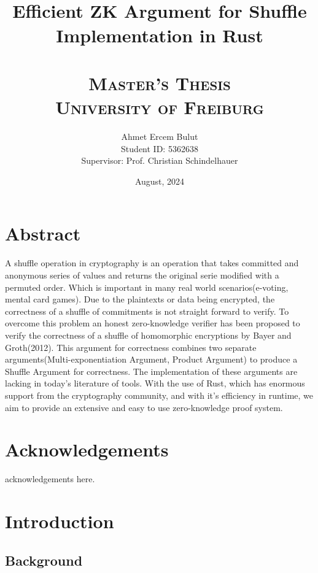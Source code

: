 \documentclass[12pt,a4paper]{report}
\title{
    \HRule \\[0.4cm]
    {\huge \bfseries  Efficient ZK Argument for Shuffle Implementation in Rust \\[0.4cm]}
    \HRule \\[1.5cm]
    \textsc{\Large Master's Thesis}\\[0.5cm]
    \textsc{\large University of Freiburg}\\[0.5cm]
}
\author{
    \Large Ahmet Ercem Bulut\\
    \Large Student ID: 5362638\\
    \Large Supervisor: Prof. Christian Schindelhauer
}
\date{August, 2024}
\begin{document}
\maketitle
\thispagestyle{empty}
\newpage

\chapter*{Abstract}
A shuffle operation in cryptography is an operation that takes committed and anonymous series of values and returns the original serie modified with a permuted order. Which is important in many real world scenarios(e-voting, mental card games).
Due to the plaintexts or data being encrypted, the correctness of a shuffle of commitments is not straight forward to verify. To overcome this problem an honest zero-knowledge verifier has been proposed to verify the correctness of a shuffle of homomorphic encryptions by Bayer and Groth(2012).
This argument for correctness combines two separate arguments(Multi-exponentiation Argument, Product Argument) to produce a Shuffle Argument for correctness. The implementation of these arguments are lacking in today’s literature of tools. With the use of Rust, which has enormous support from the cryptography community, and with it’s efficiency in runtime, we aim to provide an extensive and easy to use zero-knowledge proof
system.

\newpage

\chapter*{Acknowledgements}
acknowledgements here.

\newpage

\tableofcontents

\newpage
\listoffigures

\newpage
\listoftables

\newpage
{}

\chapter{Introduction}
\section{Background}
\end{document}
